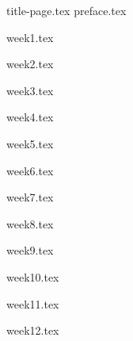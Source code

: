 \documentclass[12pt, color=cyan, mode=fancy, bibstyle=authoryear, citestyle=authoryear]
{elegantbook}
\begin{document}
{title-page.tex}
{preface.tex}

\frontmatter

\renewcommand{\baselinestretch}{0.975}

\tableofcontents

\renewcommand{\baselinestretch}{1.2}
\normalsize

\mainmatter




{week1.tex}
\newpage

{week2.tex}
\newpage

{week3.tex}
\newpage

{week4.tex}
\newpage

{week5.tex}
\newpage

{week6.tex}
\newpage

{week7.tex}
\newpage

{week8.tex}
\newpage

{week9.tex}
\newpage

{week10.tex}
\newpage

{week11.tex}
\newpage

{week12.tex}
\newpage


\printbibliography

\newpage

\printindex
\end{document}
